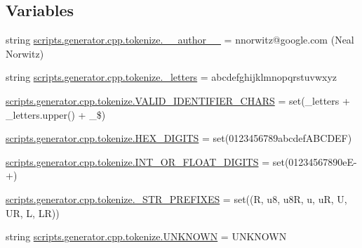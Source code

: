 \subsection*{Variables}
\begin{DoxyCompactItemize}
\item 
string \mbox{\hyperlink{namespacescripts_1_1generator_1_1cpp_1_1tokenize_afa788b0b29116321e9ea8f10fe3d9b3b}{scripts.\+generator.\+cpp.\+tokenize.\+\_\+\+\_\+author\+\_\+\+\_\+}} = \textquotesingle{}nnorwitz@google.\+com (Neal Norwitz)\textquotesingle{}
\item 
string \mbox{\hyperlink{namespacescripts_1_1generator_1_1cpp_1_1tokenize_a686a0147f093a2644d81dfb0f0783234}{scripts.\+generator.\+cpp.\+tokenize.\+\_\+letters}} = \textquotesingle{}abcdefghijklmnopqrstuvwxyz\textquotesingle{}
\item 
\mbox{\hyperlink{namespacescripts_1_1generator_1_1cpp_1_1tokenize_afe160178704f69c7f451a10b1195d31a}{scripts.\+generator.\+cpp.\+tokenize.\+V\+A\+L\+I\+D\+\_\+\+I\+D\+E\+N\+T\+I\+F\+I\+E\+R\+\_\+\+C\+H\+A\+RS}} = set(\+\_\+letters + \+\_\+letters.\+upper() + \textquotesingle{}\+\_\$\textquotesingle{})
\item 
\mbox{\hyperlink{namespacescripts_1_1generator_1_1cpp_1_1tokenize_a1761c588ca2c216dd3d7803a022ac182}{scripts.\+generator.\+cpp.\+tokenize.\+H\+E\+X\+\_\+\+D\+I\+G\+I\+TS}} = set(\textquotesingle{}0123456789abcdef\+A\+B\+C\+D\+E\+F\textquotesingle{})
\item 
\mbox{\hyperlink{namespacescripts_1_1generator_1_1cpp_1_1tokenize_a872d970d595b685444caf54ba825d91a}{scripts.\+generator.\+cpp.\+tokenize.\+I\+N\+T\+\_\+\+O\+R\+\_\+\+F\+L\+O\+A\+T\+\_\+\+D\+I\+G\+I\+TS}} = set(\textquotesingle{}01234567890e\+E-\/+\textquotesingle{})
\item 
\mbox{\hyperlink{namespacescripts_1_1generator_1_1cpp_1_1tokenize_a89f3410f006394ebf7523643a073c7c9}{scripts.\+generator.\+cpp.\+tokenize.\+\_\+\+S\+T\+R\+\_\+\+P\+R\+E\+F\+I\+X\+ES}} = set((\textquotesingle{}R\textquotesingle{}, \textquotesingle{}u8\textquotesingle{}, \textquotesingle{}u8R\textquotesingle{}, \textquotesingle{}u\textquotesingle{}, \textquotesingle{}uR\textquotesingle{}, \textquotesingle{}U\textquotesingle{}, \textquotesingle{}UR\textquotesingle{}, \textquotesingle{}L\textquotesingle{}, \textquotesingle{}LR\textquotesingle{}))
\item 
string \mbox{\hyperlink{namespacescripts_1_1generator_1_1cpp_1_1tokenize_a7bdecdb6bfdaa3a88b26e30d96ec6102}{scripts.\+generator.\+cpp.\+tokenize.\+U\+N\+K\+N\+O\+WN}} = \textquotesingle{}U\+N\+K\+N\+O\+WN\textquotesingle{}

\end{DoxyCompactItemize}
